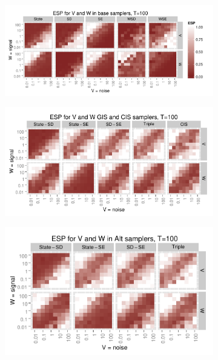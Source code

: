 \documentclass[12pt]{article}
\begin{document}
\begin{figure}[!h]
\centering
\begin{subfigure}[b]{0.59\textwidth}%
\includegraphics[width=\textwidth]{basecisESplot100}
\caption{}
\label{fig:ESPa}
\end{subfigure}
\begin{subfigure}[b]{0.53\textwidth}
\includegraphics[width=\textwidth]{altintESplotV100}
\caption{}
\label{fig:ESPb}
\end{subfigure}
\begin{subfigure}[b]{0.45\textwidth}
\includegraphics[width=\textwidth]{altintESplotW100}

\end{subfigure}
\end{figure}
\end{document}

